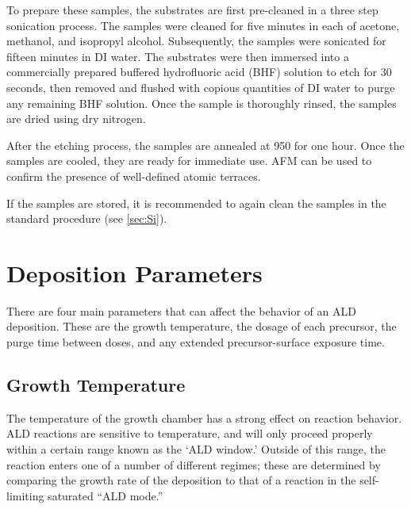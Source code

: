 To prepare these samples, the substrates are first pre-cleaned in a three step sonication process. The samples were cleaned for five minutes in each of acetone, methanol, and isopropyl alcohol. Subsequently, the samples were sonicated for fifteen minutes in DI water.\cite{koster_quasi-ideal_1998} The substrates were then immersed into a commercially prepared buffered hydrofluoric acid (BHF) solution to etch for 30 seconds, then removed and flushed with copious quantities of DI water to purge any remaining BHF solution.  Once the sample is thoroughly rinsed, the samples are dried using dry nitrogen.\cite{koster_quasi-ideal_1998} 

After the etching process, the samples are annealed at 950\degC{} for one hour.\cite{koster_quasi-ideal_1998} Once the samples are cooled, they are ready for immediate use. AFM can be used to confirm the presence of well-defined atomic terraces. 

If the samples are stored, it is recommended to again clean the samples in the standard procedure (see \vref{sec:Si}).


\section{Deposition Parameters}
\label{sec:SampFab-DepParams}

There are four main parameters that can affect the behavior of an ALD deposition.  These are the growth temperature, the dosage of each precursor, the purge time between doses, and any extended precursor-surface exposure time. 


\subsection{Growth Temperature}

The temperature of the growth chamber has a strong effect on reaction behavior. ALD reactions are sensitive to temperature, and will only proceed properly within a certain range known as the `ALD window.' Outside of this range, the reaction enters one of a number of different regimes; these are determined by comparing the growth rate of the deposition to that of a reaction in the self-limiting saturated ``ALD mode.'' 

